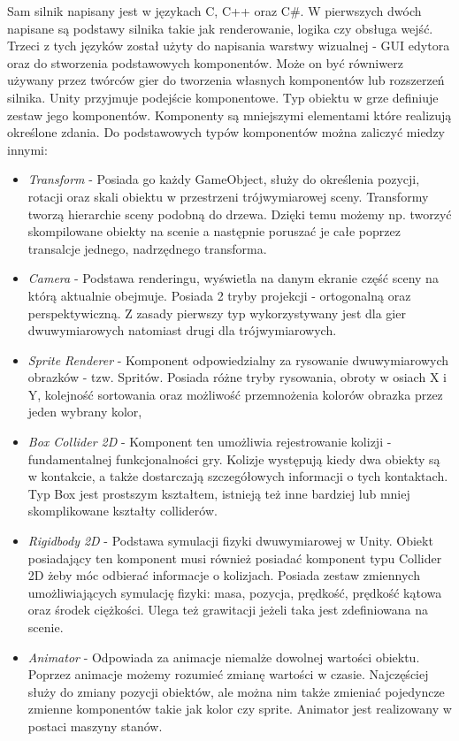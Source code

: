 \documentclass[a4paper,12pt,twoside,openany]{report}
\begin{document}
Sam silnik napisany jest w językach C, C++ oraz C\#. W pierwszych dwóch napisane są podstawy silnika takie jak renderowanie, logika czy obsługa wejść. Trzeci z tych języków został użyty do napisania warstwy wizualnej - GUI edytora oraz do stworzenia podstawowych komponentów. Może on być równiwerz używany przez twórców gier do tworzenia własnych komponentów lub rozszerzeń silnika. Unity przyjmuje podejście komponentowe. Typ obiektu w grze definiuje zestaw jego komponentów. Komponenty są mniejszymi elementami które realizują określone zdania. Do podstawowych typów komponentów można zaliczyć miedzy innymi:
\begin{itemize}
    \item \textit{Transform} - Posiada go każdy GameObject, służy do określenia pozycji, rotacji oraz skali obiektu w przestrzeni trójwymiarowej sceny. Transformy tworzą hierarchie sceny podobną do drzewa. Dzięki temu możemy np. tworzyć skompilowane obiekty na scenie a następnie poruszać je całe poprzez transalcje jednego, nadrzędnego transforma.
    \item \textit{Camera} - Podstawa renderingu, wyświetla na danym ekranie część sceny na którą aktualnie obejmuje. Posiada 2 tryby projekcji - ortogonalną oraz perspektywiczną. Z zasady pierwszy typ wykorzystywany jest dla gier dwuwymiarowych natomiast drugi dla trójwymiarowych.
    \item \textit{Sprite Renderer} - Komponent odpowiedzialny za rysowanie dwuwymiarowych obrazków - tzw. Spritów. Posiada różne tryby rysowania, obroty w osiach X i Y, kolejność sortowania oraz możliwość przemnożenia kolorów obrazka przez jeden wybrany kolor,
    \item \textit{Box Collider 2D} - Komponent ten umożliwia rejestrowanie kolizji - fundamentalnej funkcjonalności gry. Kolizje występują kiedy dwa obiekty są w kontakcie, a także dostarczają szczegółowych informacji o tych kontaktach. Typ Box jest prostszym kształtem, istnieją też inne bardziej lub mniej skomplikowane kształty colliderów.
    \item \textit{Rigidbody 2D} - Podstawa symulacji fizyki dwuwymiarowej w Unity. Obiekt posiadający ten komponent musi również posiadać komponent typu Collider 2D żeby móc odbierać informacje o kolizjach. Posiada zestaw zmiennych umożliwiających symulację fizyki: masa, pozycja, prędkość, prędkość kątowa oraz środek ciężkości. Ulega też grawitacji jeżeli taka jest zdefiniowana na scenie.
    \item \textit{Animator} - Odpowiada za animacje niemalże dowolnej wartości obiektu. Poprzez animacje możemy rozumieć zmianę wartości w czasie. Najczęściej służy do zmiany pozycji obiektów, ale można nim także zmieniać pojedyncze zmienne komponentów takie jak kolor czy sprite. Animator jest realizowany w postaci maszyny stanów.

\end{itemize}
\end{document}
